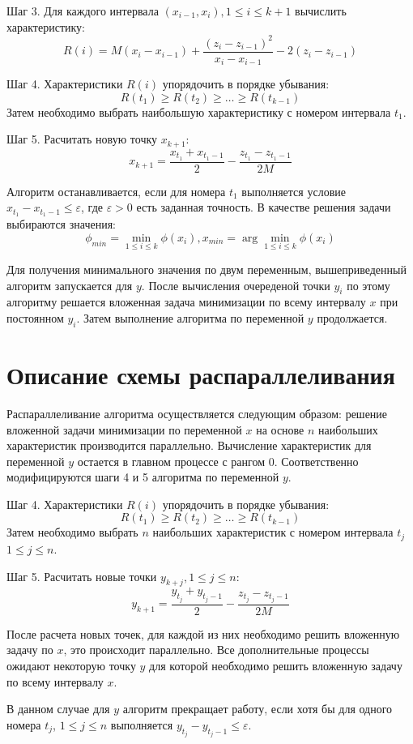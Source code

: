 \documentclass{report}
\begin{document}
\par Шаг 3. Для каждого интервала $(x_{i-1}, x_i), 1 \leq i \leq k+1$ вычислить характеристику:
$$ R(i) = M(x_i - x_{i-1}) + \frac{(z_i - z_{i-1})^2}{x_i - x_{i-1}} - 2(z_i - z_{i-1})$$
\par Шаг 4. Характеристики $R(i)$ упорядочить в порядке убывания:
$$ R(t_1) \geq R(t_2) \geq \ldots \geq R(t_{k-1})$$
Затем необходимо выбрать наибольшую характеристику с номером интервала $t_1$.
\par Шаг 5. Расчитать новую точку $x_{k+1}$:
$$ x_{k+1} = \frac{x_{t_1} + x_{t_1 - 1}}{2} - \frac{z_{t_1} - z_{t_1 - 1}}{2M}$$
\par Алгоритм останавливается, если для номера $t_1$ выполняется условие $x_{t_1} - x_{t_1 - 1} \leq \varepsilon$, где $\varepsilon>0$ есть заданная точность. В качестве решения задачи выбираются значения:
$$\phi_{min} = \min\limits_{1 \leq i \leq k}\phi(x_i), x_{min} = \arg{\min\limits_{1 \leq i \leq k}\phi(x_i)}$$
\par Для получения минимального значения по двум переменным, вышеприведенный алгоритм запускается для $y$. После вычисления очереденой точки $y_i$ по этому алгоритму решается вложенная задача минимизации по всему интервалу $x$  при постоянном $y_i$. Затем выполнение алгоритма по переменной $y$ продолжается.


\newpage

\section*{Описание схемы распараллеливания}
\par Распараллеливание алгоритма осуществляется следующим образом: решение вложенной задачи минимизации по переменной $x$ на основе $n$ наибольших характеристик производится параллельно. Вычисление характеристик для переменной $y$ остается в главном процессе с рангом 0. Соответственно модифицируются шаги 4 и 5 алгоритма по переменной $y$.
\par Шаг 4. Характеристики $R(i)$ упорядочить в порядке убывания:
$$ R(t_1) \geq R(t_2) \geq \ldots \geq R(t_{k-1})$$
Затем необходимо выбрать $n$ наибольших характеристик с номером интервала $t_j$ $1 \leq j \leq n$.
\par Шаг 5. Расчитать новые точки $y_{k+j}, 1 \leq j \leq n$:
$$ y_{k+1} = \frac{y_{t_j} + y_{t_j - 1}}{2} - \frac{z_{t_j} - z_{t_j - 1}}{2M}$$
\par После расчета новых точек, для каждой из них необходимо решить вложенную задачу по $x$, это происходит параллельно. Все дополнительные процессы ожидают некоторую точку $y$ для которой необходимо решить вложенную задачу по всему интервалу $x$.
\par В данном случае для $y$ алгоритм прекращает работу, если хотя бы для одного номера $t_j$, $1 \leq j \leq n$ выполняется $y_{t_j} - y_{t_j - 1} \leq \varepsilon$.
\newpage
\end{document}

